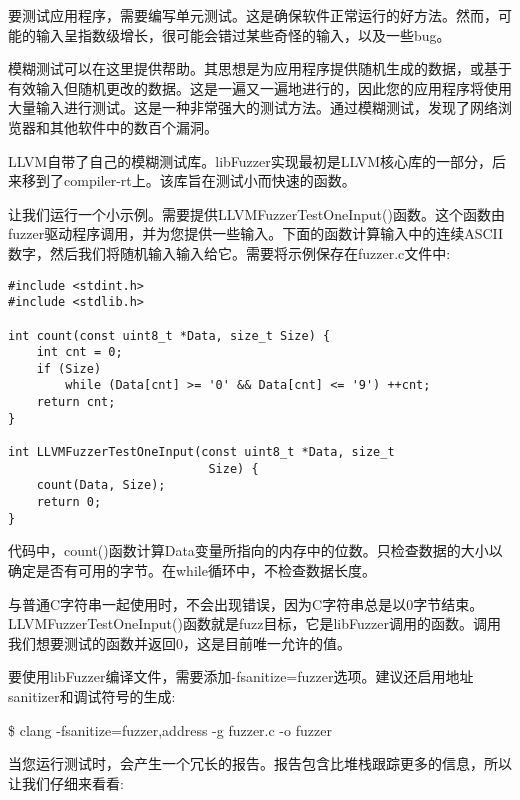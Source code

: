 
要测试应用程序，需要编写单元测试。这是确保软件正常运行的好方法。然而，可能的输入呈指数级增长，很可能会错过某些奇怪的输入，以及一些bug。\par

模糊测试可以在这里提供帮助。其思想是为应用程序提供随机生成的数据，或基于有效输入但随机更改的数据。这是一遍又一遍地进行的，因此您的应用程序将使用大量输入进行测试。这是一种非常强大的测试方法。通过模糊测试，发现了网络浏览器和其他软件中的数百个漏洞。\par

LLVM自带了自己的模糊测试库。libFuzzer实现最初是LLVM核心库的一部分，后来移到了compiler-rt上。该库旨在测试小而快速的函数。\par

让我们运行一个小示例。需要提供LLVMFuzzerTestOneInput()函数。这个函数由fuzzer驱动程序调用，并为您提供一些输入。下面的函数计算输入中的连续ASCII数字，然后我们将随机输入输入给它。需要将示例保存在fuzzer.c文件中:\par

\begin{lstlisting}[caption={}]
#include <stdint.h>
#include <stdlib.h>

int count(const uint8_t *Data, size_t Size) {
	int cnt = 0;
	if (Size)
		while (Data[cnt] >= '0' && Data[cnt] <= '9') ++cnt;
	return cnt;
}

int LLVMFuzzerTestOneInput(const uint8_t *Data, size_t
							Size) {
	count(Data, Size);
	return 0;
}
\end{lstlisting}

代码中，count()函数计算Data变量所指向的内存中的位数。只检查数据的大小以确定是否有可用的字节。在while循环中，不检查数据长度。\par

与普通C字符串一起使用时，不会出现错误，因为C字符串总是以0字节结束。LLVMFuzzer\allowbreak TestOneInput()函数就是fuzz目标，它是libFuzzer调用的函数。调用我们想要测试的函数并返回0，这是目前唯一允许的值。\par

要使用libFuzzer编译文件，需要添加-fsanitize=fuzzer选项。建议还启用地址sanitizer和调试符号的生成:\par

\begin{tcolorbox}[colback=white,colframe=black]
\$ clang -fsanitize=fuzzer,address -g fuzzer.c -o fuzzer
\end{tcolorbox}

当您运行测试时，会产生一个冗长的报告。报告包含比堆栈跟踪更多的信息，所以让我们仔细来看看:\par


